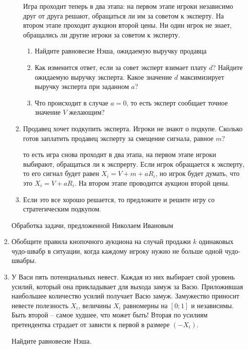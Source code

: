 \begin{enumerate}
\begin{enumerate}
Игра проходит теперь в два этапа: на первом этапе игроки независимо друг от друга решают, обращаться ли им за советом к эксперту. На втором этапе проходит аукцион второй цены. Ни один игрок не знает, обращались ли другие игроки за советом к эксперту.

\begin{enumerate}
\item Найдите равновесие Нэша, ожидаемую выручку продавца
\item Как изменится ответ, если за совет эксперт взимает плату $d$? Найдите ожидаемую выручку эксперта. Какое значение $d$ максимизирует выручку эксперта при заданном $a$?
\item Что происходит в случае $a=0$, то есть эксперт сообщает точное значение $V$ желающим?
\end{enumerate}

\item Продавец хочет подкупить эксперта. Игроки не знают о подкупе. Сколько готов заплатить продавец эксперту за смещение сигнала, равное $m$?

то есть игра снова проходит в два этапа, на первом этапе игроки выбирают, обращаться ли к экспрерту. Если игрок обращается к эксперту, то его сигнал будет равен $X_{i}=V+m+aR_{i}$, но игрок будет думать, что это $X_{i}=V+aR_{i}$. На втором этапе проводится аукцион второй цены.

\item Если это все хорошо решается, то предложите и решите игру со стратегическим подкупом.

\end{enumerate}

Обработка задачи, предложенной Николаем Ивановым


\item Обобщите правила кнопочного аукциона на случай продажи $k$ одинаковых чудо-швабр в ситуации, когда каждому игроку нужно не больше одной чудо-швабры.


\item У Васи пять потенциальных невест. Каждая из них выбирает свой уровень усилий, который она прикладывает для выхода замуж за Васю. Приложившая наибольшее количество усилий получает Васю замуж. Замужество приносит невесте полезность $X_{i}$, величины $X_{i}$ равномерны на $[0;1]$ и независимы. Быть второй -- самое худшее, что может быть! Вторая по усилиям претендентка страдает от зависти к первой в размере $(-X_{i})$.

Найдите равновесие Нэша.



\end{enumerate}
